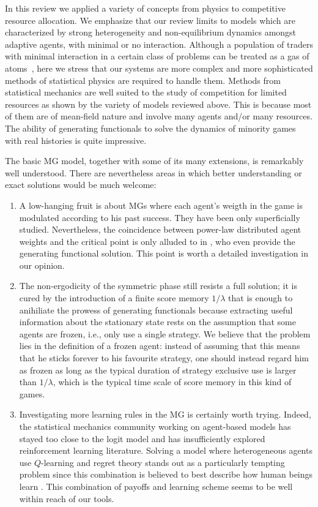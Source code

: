 \documentclass[aps,twocolumn,nofootinbib,sortedaddress,reprint]{revtex4-1}
\begin{document}
In this review we applied a variety of concepts
from physics  to competitive resource allocation.
We emphasize that our review limits to models which are characterized
by strong heterogeneity and non-equilibrium dynamics amongst adaptive agents,
with minimal or no interaction.
Although a population of traders with minimal interaction in a certain class of
problems  can be treated as a gas of atoms~\cite{Chakrabarti2013},
here we stress  that  our systems are more complex and
more sophisticated methods of statistical physics are required
to handle them.
Methods from statistical mechanics are well suited to the study of competition for limited resources as shown by the variety of models reviewed above. This is because most of them are of mean-field nature and involve many agents and/or many resources. The ability of generating functionals to solve the dynamics of minority games with real histories is quite impressive.


The basic MG model, together with some of its many extensions, is remarkably well understood. There are nevertheless areas in which better understanding or exact solutions would be much welcome:
\begin{enumerate}
\item
A low-hanging fruit is about MGs where each agent's weigth in the game is modulated according to his past success. They have been only superficially studied. Nevertheless, the coincidence between power-law distributed agent weights and the critical point is only alluded to in \textcite{galla2009minority}, who even provide the generating functional solution. This point is worth a detailed investigation in our opinion.

\item The non-ergodicity of the
symmetric phase still resists a full solution; it is cured by the
introduction of a finite score memory $1/\lambda$ that is enough to anihiliate the prowess of generating functionals because extracting useful information about the stationary state rests on the assumption that some agents are frozen, i.e., only use a single strategy. We believe that the problem lies in the definition of a frozen agent: instead of assuming that this means that he sticks forever to his favourite strategy, one should instead regard him as frozen as long as the typical duration of strategy exclusive use is larger than $1/\lambda$, which is the typical time scale of score memory in this kind of games.

\item
Investigating more learning rules in the MG is certainly worth trying. Indeed, the statistical mechanics community working on agent-based models has stayed too close to the logit model and has insufficiently explored reinforcement learning literature. Solving a model where heterogeneous agents use $Q$-learning and regret theory stands out as a particularly tempting problem since this combination is believed to best describe how human beings learn \cite{lohrenz2007neural}. This combination of payoffs and learning scheme seems to be well within reach of our tools.

\end{enumerate}
\end{document}
